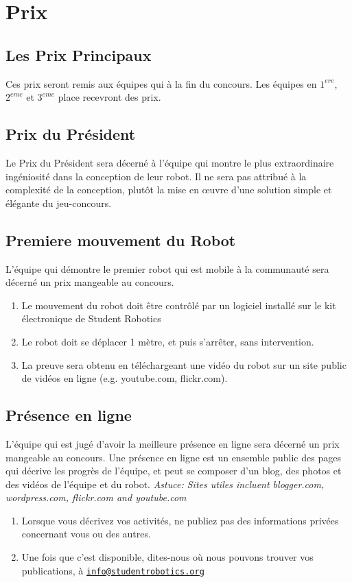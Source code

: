 \section {Prix}
\label{sec:Awards}

\subsection{Les Prix Principaux}
Ces prix seront remis aux équipes qui à la fin du concours. Les équipes en $1^{ere}$, $2^{eme}$ et $3^{eme}$ place recevront des prix.

\subsection{Prix du Président}
Le Prix du Président sera décerné à l'équipe qui montre le plus extraordinaire ingéniosité dans la conception de leur robot. Il ne sera pas attribué à la complexité de la conception, plutôt la mise en œuvre d'une solution simple et élégante du jeu-concours.

\subsection{Premiere mouvement du Robot}
L'équipe qui démontre le premier robot qui est mobile à la communauté sera décerné un prix mangeable au concours.
\begin{enumerate}
\item Le mouvement du robot doit être contrôlé par un logiciel installé sur le kit électronique de Student Robotics
\item Le robot doit se déplacer 1 mètre, et puis s'arrêter, sans intervention.
\item La preuve sera obtenu en téléchargeant une vidéo du robot sur un site public de vidéos en ligne (e.g. youtube.com, flickr.com).
\end{enumerate}


\subsection{Présence en ligne}
L'équipe qui est jugé d'avoir la meilleure présence en ligne sera décerné un prix mangeable au concours. Une présence en ligne est un ensemble public des pages qui décrive les progrès de l'équipe, et peut se composer d'un blog, des photos et des vidéos de l'équipe et du robot.  \emph{Astuce: Sites utiles incluent blogger.com, wordpress.com, flickr.com and youtube.com}
\begin{enumerate}
\item Lorsque vous décrivez vos activités, ne publiez pas des informations privées concernant vous ou des autres.
\item Une fois que c'est disponible, dites-nous où nous pouvons trouver vos publications, à \href{mailto:info@studentrobotics.org}{\nolinkurl{info@studentrobotics.org}}
\end{enumerate}
